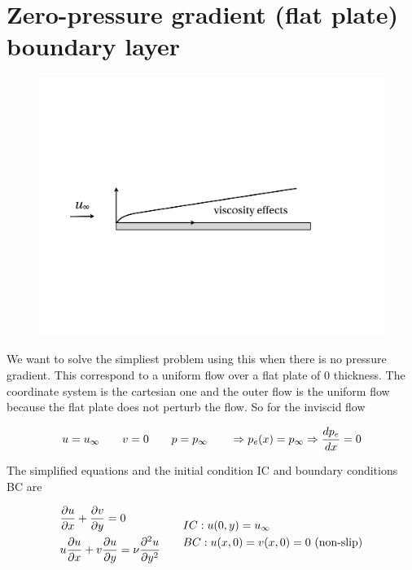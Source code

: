 \section{Zero-pressure gradient (flat plate) boundary layer}
	\begin{figure}
	\vspace{0mm}
	\includegraphics[scale=0.23]{ch5/2}
	\end{figure}
	We want to solve the simpliest problem using this when there is no pressure gradient. This correspond to a uniform flow over a flat plate of 0 thickness. The coordinate system is the cartesian one and the outer flow is the uniform flow because the flat plate does not perturb the flow. So for the inviscid flow 
	
	\begin{equation}
		u = u_\infty \qquad v = 0 \qquad p = p_\infty \qquad \Rightarrow p_e(x) = p_\infty \Rightarrow \frac{dp_e}{dx} = 0
	\end{equation}
	
	\newpage
	The simplified equations and the initial condition IC and boundary conditions BC are
	
	\begin{equation}
	\begin{aligned}
		&\frac{\partial u}{\partial x} + \frac{\partial v}{\partial y} = 0\\
		&u \frac{\partial u}{\partial x} + v \frac{\partial u}{\partial y} = \nu \frac{\partial ^2 u}{\partial y^2}
	\end{aligned}	
	\qquad
	\begin{aligned}
	&IC: u(0,y) = u_\infty\\
	&BC: u(x,0) = v(x,0) = 0 \mbox{ (non-slip)}
	\end{aligned}
	\end{equation}
	
